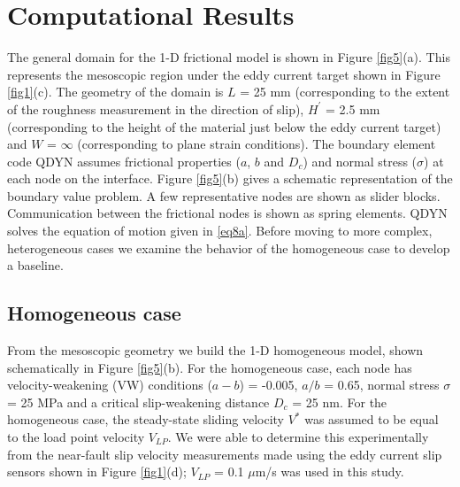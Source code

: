 \documentclass[preprint,1p, 10pt,authoryear]{elsarticle}
\begin{document}
\section{Computational Results}

The general domain for the 1-D frictional model is shown in Figure \ref{fig5}(a). This represents the mesoscopic region under the eddy current target shown in Figure \ref{fig1}(c). The geometry of the domain is $L$ = 25 mm (corresponding to the extent of the roughness measurement in the direction of slip), $H^{'}$ = 2.5 mm (corresponding to the height of the material just below the eddy current target) and $W$ = $\infty$ (corresponding to plane strain conditions). The boundary element code QDYN assumes frictional properties ($a$, $b$ and $D_{c}$) and normal stress ($\sigma$) at each node on the interface. Figure \ref{fig5}(b) gives a schematic representation of the boundary value problem. A few representative nodes are shown as slider blocks. Communication between the frictional nodes is shown as spring elements. QDYN  solves the equation of motion given in \eqref{eq8a}. Before moving to more complex, heterogeneous cases we examine the behavior of the homogeneous case to develop a baseline.    

\subsection{Homogeneous case}
From the mesoscopic geometry we build the 1-D homogeneous model, shown schematically in Figure \ref{fig5}(b). For the homogeneous case, each node has velocity-weakening (VW) conditions ($a-b$) = -0.005, $a/b$ = 0.65, normal stress $\sigma$ = 25 MPa and a critical slip-weakening distance $D_{c}$ = 25 nm. For the homogeneous case, the steady-state sliding velocity $V^{*}$ was assumed to be equal to the load point velocity $V_{LP}$. We were able to determine this experimentally from the near-fault slip velocity measurements made using the eddy current slip sensors shown in Figure \ref{fig1}(d); $V_{LP}$ = 0.1 $\mu$m/s  was used in this study.
\end{document}

